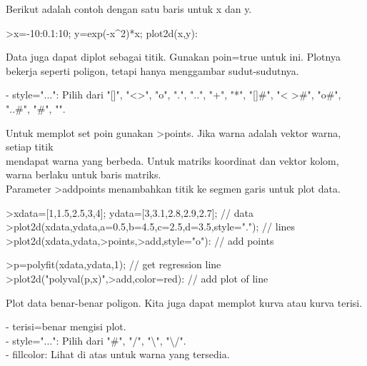 \documentclass{article}
\begin{document}
\begin{eulernotebook}
\begin{eulercomment}
\begin{eulercomment}
\begin{eulercomment}
\begin{eulercomment}
\begin{eulercomment}
Berikut adalah contoh dengan satu baris untuk x dan y.
\end{eulercomment}
\begin{eulerprompt}
>x=-10:0.1:10; y=exp(-x^2)*x; plot2d(x,y):
\end{eulerprompt}
\begin{eulercomment}
Data juga dapat diplot sebagai titik. Gunakan poin=true untuk ini.
Plotnya bekerja seperti poligon, tetapi hanya menggambar
sudut-sudutnya.

- style="...": Pilih dari "[]", "\textless{}\textgreater{}", "o", ".", "..", "+", "*", "[]#",
"\textless{} \textgreater{}#", "o#", "..#", "#", "\textbar{}".

Untuk memplot set poin gunakan \textgreater{}points. Jika warna adalah vektor
warna, setiap titik\\
mendapat warna yang berbeda. Untuk matriks koordinat dan vektor kolom,
warna berlaku untuk baris matriks.\\
Parameter \textgreater{}addpoints menambahkan titik ke segmen garis untuk plot
data.
\end{eulercomment}
\begin{eulerprompt}
>xdata=[1,1.5,2.5,3,4]; ydata=[3,3.1,2.8,2.9,2.7]; // data
>plot2d(xdata,ydata,a=0.5,b=4.5,c=2.5,d=3.5,style="."); // lines
>plot2d(xdata,ydata,>points,>add,style="o"): // add points
\end{eulerprompt}
\begin{eulerprompt}
>p=polyfit(xdata,ydata,1); // get regression line
>plot2d("polyval(p,x)",>add,color=red): // add plot of line
\end{eulerprompt}
\begin{eulercomment}
Plot data benar-benar poligon. Kita juga dapat memplot kurva atau
kurva terisi.

- terisi=benar mengisi plot.\\
- style="...": Pilih dari "#", "/", "\textbackslash{}", "\textbackslash{}/".\\
- fillcolor: Lihat di atas untuk warna yang tersedia.


\end{eulercomment}
\end{eulercomment}
\end{eulercomment}
\end{eulercomment}
\end{eulercomment}
\end{eulernotebook}
\end{document}
